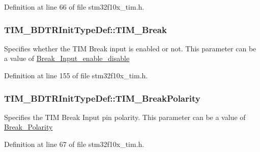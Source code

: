 Definition at line 66 of file stm32f10x\+\_\+tim.\+h.

\subsubsection[{\texorpdfstring{T\+I\+M\+\_\+\+Break}{TIM_Break}}]{ T\+I\+M\+\_\+\+B\+D\+T\+R\+Init\+Type\+Def\+::\+T\+I\+M\+\_\+\+Break}\hypertarget{struct_t_i_m___b_d_t_r_init_type_def_a9fcf20632d0377727476a98f7183be56}{}\label{struct_t_i_m___b_d_t_r_init_type_def_a9fcf20632d0377727476a98f7183be56}
Specifies whether the T\+IM Break input is enabled or not. This parameter can be a value of \hyperlink{group___break___input__enable__disable}{Break\+\_\+\+Input\+\_\+enable\+\_\+disable} 

Definition at line 155 of file stm32f10x\+\_\+tim.\+h.

\subsubsection[{\texorpdfstring{T\+I\+M\+\_\+\+Break\+Polarity}{TIM_BreakPolarity}}]{ T\+I\+M\+\_\+\+B\+D\+T\+R\+Init\+Type\+Def\+::\+T\+I\+M\+\_\+\+Break\+Polarity}\hypertarget{struct_t_i_m___b_d_t_r_init_type_def_a686eee58b4543f0a5788df44556b6c8e}{}\label{struct_t_i_m___b_d_t_r_init_type_def_a686eee58b4543f0a5788df44556b6c8e}
Specifies the T\+IM Break Input pin polarity. This parameter can be a value of \hyperlink{group___break___polarity}{Break\+\_\+\+Polarity} 

Definition at line 67 of file stm32f10x\+\_\+tim.\+h.

